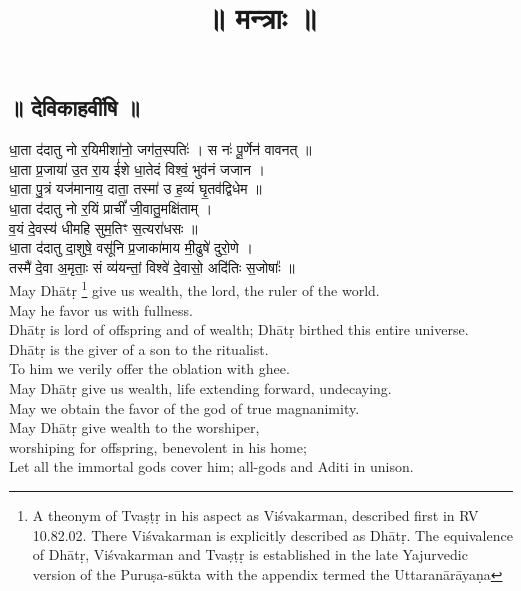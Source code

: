 \documentclass[11pt]{article}
\title{\textbf{ {\skt ॥ मन्त्राः ॥ }}}
\author{}
\date{}
\begin{document}
\begin{center}
	\section{{\Large\skts ॥ देविकाहवींषि ॥}}
\end{center}
\begin{adjustwidth}{6em}{.2em}
	{\large\skts\color{deepblue}
धा॒ता द॑दातु नो र॒यिमीशा॑नो॒ जग॑त॒स्पतिः॑ । स नः॑ पू॒र्णेन॑ वावनत् ॥ \\
धा॒ता प्र॒जाया॑ उ॒त रा॒य ई॑शे धा॒तेदं विश्वं॒ भुव॑नं जजान । \\
धा॒ता पु॒त्रं यज॑मानाय॒ दाता॒ तस्मा॑ उ ह॒व्यं घृ॒तव॑द्विधेम ॥ \\
धा॒ता द॑दातु नो र॒यिं प्राचीं᳚ जी॒वातु॒मक्षि॑ताम् । \\
व॒यं दे॒वस्य॑ धीमहि सुम॒तिꣳ स॒त्यरा॑धसः ॥\\
धा॒ता द॑दातु दा॒शुषे॒ वसू॑नि प्र॒जाका॑माय मी॒ढुषे॑ दुरो॒णे ।\\
तस्मै॑ दे॒वा अ॒मृताः॒ सं व्य॑यन्तां॒ विश्वे॑ दे॒वासो॒ अदि॑तिः स॒जोषाः᳚ ॥
}\\[5pt]
May Dhātṛ \footnote{A theonym of Tvaṣṭṛ in his aspect as Viśvakarman, described first in RV 10.82.02. There Viśvakarman is explicitly described as Dhātṛ. The equivalence of Dhātṛ, Viśvakarman and Tvaṣṭṛ is established in the late Yajurvedic version of the Puruṣa-sūkta with the appendix termed the Uttaranārāyaṇa} give us wealth, the lord, the ruler of the world.\\
May he favor us with fullness.\\
Dhātṛ is lord of offspring and of wealth; Dhātṛ birthed this entire universe.\\
Dhātṛ is the giver of a son to the ritualist.\\
To him we verily offer the oblation with ghee.\\
May Dhātṛ give us wealth, life extending forward, undecaying.\\
May we obtain the favor of the god of true magnanimity.\\
May Dhātṛ give wealth to the worshiper,\\
worshiping for offspring, benevolent in his home;\\
Let all the immortal gods cover him; all-gods and Aditi in unison.\\[10pt]


\end{adjustwidth}
\end{document}

